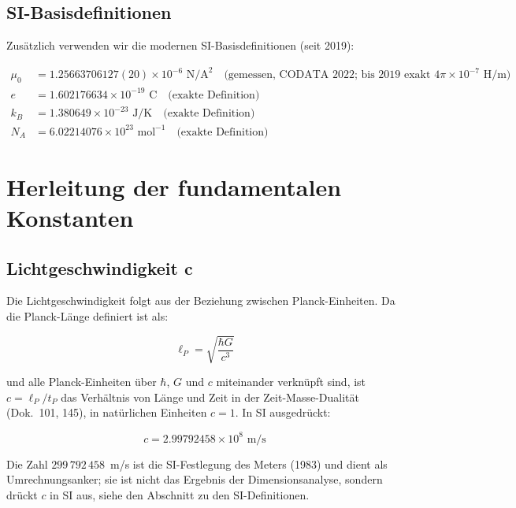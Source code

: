 	\subsection{SI-Basisdefinitionen}
	
	Zusätzlich verwenden wir die modernen SI-Basisdefinitionen (seit 2019):
	
	\begin{align}
		\mu_0 &= 1.25663706127(20) \times 10^{-6} \text{ N/A}^2 \quad \text{(gemessen, CODATA 2022; bis 2019 exakt } 4\pi \times 10^{-7} \text{ H/m)}\\
		e &= 1.602176634 \times 10^{-19} \text{ C} \quad \text{(exakte Definition)}\\
		k_B &= 1.380649 \times 10^{-23} \text{ J/K} \quad \text{(exakte Definition)}\\
		N_A &= 6.02214076 \times 10^{23} \text{ mol}^{-1} \quad \text{(exakte Definition)}
	\end{align}
	
	\section{Herleitung der fundamentalen Konstanten}
	
	\subsection{Lichtgeschwindigkeit c}
	
	Die Lichtgeschwindigkeit folgt aus der Beziehung zwischen Planck-Einheiten. Da die Planck-Länge definiert ist als:
	
	\begin{equation}
		\ell_P = \sqrt{\frac{\hbar G}{c^3}}
	\end{equation}
	
	und alle Planck-Einheiten über $\hbar$, $G$ und $c$ miteinander verknüpft sind, ist $c = \ell_P/t_P$ das Verhältnis von Länge und Zeit in der Zeit-Masse-Dualität (Dok.~101, 145), in natürlichen Einheiten $c = 1$. In SI ausgedrückt:
	
	\begin{tcolorbox}[colback=green!5!white,colframe=green!75!black,title=Lichtgeschwindigkeit]
		\begin{equation}
			\boxed{c = 2.99792458 \times 10^8 \text{ m/s}}
		\end{equation}
	\end{tcolorbox}
	
	Die Zahl $299\,792\,458$~m/s ist die SI-Festlegung des Meters (1983) und dient als Umrechnungsanker; sie ist nicht das Ergebnis der Dimensionsanalyse, sondern drückt $c$ in SI aus, siehe den Abschnitt zu den SI-Definitionen.
	
